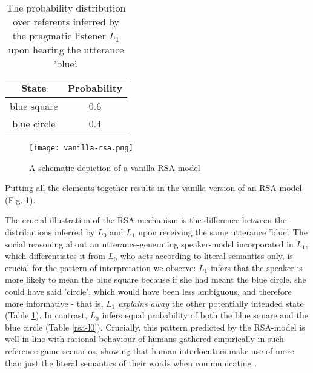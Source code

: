 \begin{table}[h]
	\begin{center}
		\caption{The probability distribution over referents inferred by the pragmatic listener $L_1$ upon hearing the utterance 'blue'.}
		\label{rsa-l1}
		\vskip 0.12in
		\begin{tabular}{cc}
			State & Probability \\
			\hline
			blue square & 0.6 \\
			blue circle & 0.4
		\end{tabular}
	\end{center}
\end{table}

\begin{figure*}[t]
	\begin{center}
		\texttt{[image: vanilla-rsa.png]}
	\end{center}
	\vspace{-0.3cm}
	\caption{A schematic depiction of a vanilla RSA model \parencite{problang}}
	\label{vanilla-rsa}
\end{figure*}
Putting all the elements together results in the vanilla version of an RSA-model (Fig. \ref{vanilla-rsa}).

The crucial illustration of the RSA mechanism is the difference between the distributions inferred by $L_0$ and $L_1$ upon receiving the same utterance 'blue'. The social reasoning about an utterance-generating speaker-model incorporated in $L_1$, which differentiates it from $L_0$ who acts according to literal semantics only, is crucial for the pattern of interpretation we observe: $L_1$ infers that the speaker is more likely to mean the blue square because if she had meant the blue circle, she could have said 'circle', which would have been less ambiguous, and therefore more informative - that is, $L_1$ \emph{explains away} the other potentially intended state (Table \ref{rsa-l1}). In contrast, $L_0$ infers equal probability of both the blue square and the blue circle (Table \ref{rsa-l0}). Crucially, this pattern predicted by the RSA-model is well in line with rational behaviour of humans gathered empirically in such reference game scenarios, showing that human interlocutors make use of more than just the literal semantics of their words when communicating \parencite{frank2012predicting, problang}.


